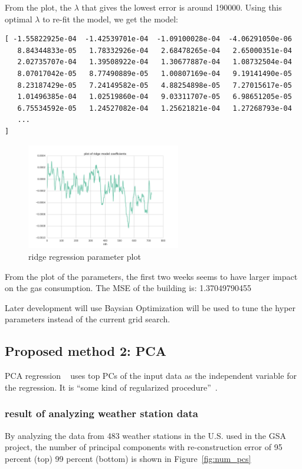 \documentclass[12pt]{article}
\newcommand{\fref}[1]{Figure~\ref{#1}}
\begin{document}
From the plot, the $\lambda$ that gives the lowest error is around
190000. Using this optimal $\lambda$ to re-fit the model, we get the
model:
\begin{verbatim}
[ -1.55822925e-04  -1.42539701e-04  -1.09100028e-04  -4.06291050e-06
   8.84344833e-05   1.78332926e-04   2.68478265e-04   2.65000351e-04
   2.02735707e-04   1.39508922e-04   1.30677887e-04   1.08732504e-04
   8.07017042e-05   8.77490889e-05   1.00807169e-04   9.19141490e-05
   8.23187429e-05   7.24149582e-05   4.88254898e-05   7.27015617e-05
   1.01496385e-04   1.02519860e-04   9.03311707e-05   6.98651205e-05
   6.75534592e-05   1.24527082e-04   1.25621821e-04   1.27268793e-04
   ...
]
\end{verbatim}
\begin{figure}[h!]
  \centering
  \includegraphics[width=0.6\textwidth]{images/param_ridge_opt.png}
  \caption{ridge regression parameter plot}
  \label{fig:param_ridge_opt}
\end{figure}
\FloatBarrier

From the plot of the parameters, the first two weeks seems to have
larger impact on the gas consumption. The MSE of the building is: 1.37049790455

Later development will use Baysian Optimization will be used to tune
the hyper parameters instead of the current grid search.
\subsection{Proposed method 2: PCA}
PCA regression ~\cite{pcrWiki2016} uses top PCs of the input data as
the independent variable for the regression. It is ``some kind of
regularized procedure''~\cite{pcrWiki2016}.
\subsubsection{result of analyzing weather station data}
By analyzing the data from 483 weather stations in the U.S. used in
the GSA project, the number of principal components with
re-construction error of 95 percent (top) 99 percent (bottom) is shown
in \fref{fig:num_pcs}
\end{document}
